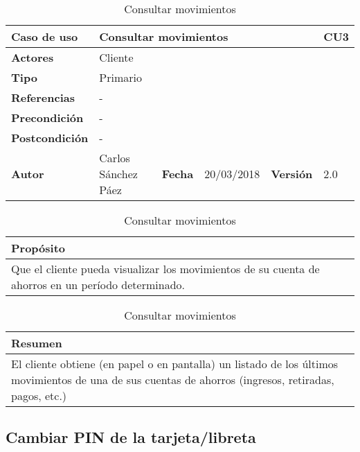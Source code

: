 \documentclass[12pt,spanish]{article}
\begin{document}
\begin{table}[H]
\centering
\begin{tabular}{|m{3cm}|m{4cm}|m{2cm}|m{2cm}|m{2cm}|m{1cm}|}
\hline
\textbf{Caso de uso} &  \multicolumn{4}{m{8cm}|}{Consultar movimientos} \vline &  \cellcolor{gray!40}CU3 \\
\hline
\textbf{Actores} & \multicolumn{5}{m{8cm}|}{Cliente} \\
\hline
\textbf{Tipo} & \multicolumn{5}{m{8cm}|}{Primario} \\
\hline
\textbf{Referencias} &\multicolumn{5}{m{8cm}|}{-} \\
\hline
\textbf{Precondición} & \multicolumn{5}{m{8cm}|}{-} \\
\hline
\textbf{Postcondición} & \multicolumn{5}{m{8cm}|}{-} \\
\hline
\textbf{Autor} & Carlos Sánchez Páez & \textbf{Fecha} & 20/03/2018 & \textbf{Versión} & 2.0 \\
\hline
\end{tabular}

\vspace{1cm}

\begin{tabular}{|m{16.2cm}|}
\hline
\textbf{Propósito} \\
\hline
Que el cliente pueda visualizar los movimientos de su cuenta de ahorros en un período determinado. \\
\hline
\end{tabular}

\vspace{1cm}

\begin{tabular}{|m{16.2cm}|}
\hline
\textbf{Resumen} \\
\hline
El cliente obtiene (en papel o en pantalla) un listado de los últimos movimientos de una de sus cuentas de ahorros (ingresos, retiradas, pagos, etc.) \\
\hline
\end{tabular}

\caption{Consultar movimientos}

\end{table}


\subsection{Cambiar PIN de la tarjeta/libreta}
\end{document}
